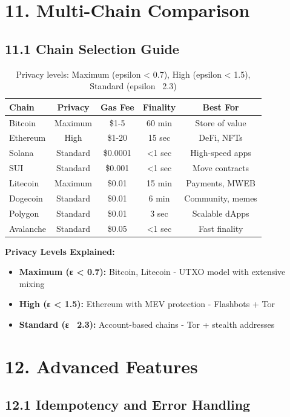 \documentclass[11pt,a4paper]{article}
\begin{document}
\section{11. Multi-Chain Comparison}

\subsection{11.1 Chain Selection Guide}

\begin{table}[h]
\centering
\small
\begin{tabular}{lcccc}
\toprule
\textbf{Chain} & \textbf{Privacy} & \textbf{Gas Fee} & \textbf{Finality} & \textbf{Best For} \\
\midrule
Bitcoin & Maximum & \$1-5 & 60 min & Store of value \\
Ethereum & High & \$1-20 & 15 sec & DeFi, NFTs \\
Solana & Standard & \$0.0001 & <1 sec & High-speed apps \\
SUI & Standard & \$0.001 & <1 sec & Move contracts \\
Litecoin & Maximum & \$0.01 & 15 min & Payments, MWEB \\
Dogecoin & Standard & \$0.01 & 6 min & Community, memes \\
Polygon & Standard & \$0.01 & 3 sec & Scalable dApps \\
Avalanche & Standard & \$0.05 & <1 sec & Fast finality \\
\bottomrule
\end{tabular}
\caption{Privacy levels: Maximum (epsilon < 0.7), High (epsilon < 1.5), Standard (epsilon ~2.3)}
\end{table}

\textbf{Privacy Levels Explained:}
\begin{itemize}
    \item \textbf{Maximum (ε < 0.7):} Bitcoin, Litecoin - UTXO model with extensive mixing
    \item \textbf{High (ε < 1.5):} Ethereum with MEV protection - Flashbots + Tor
    \item \textbf{Standard (ε ~2.3):} Account-based chains - Tor + stealth addresses
\end{itemize}

\section{12. Advanced Features}

\subsection{12.1 Idempotency and Error Handling}
\end{document}
